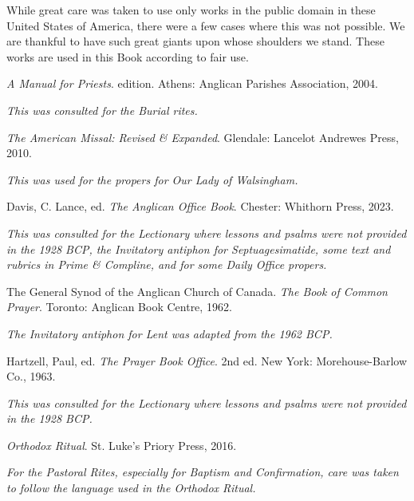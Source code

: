 \documentclass[10pt]{book}
\begin{document}
While great care was taken to use only works in the public domain in these United States of America, there were a few cases where this was not possible. We are thankful to have such great giants upon whose shoulders we stand. These works are used in this Book according to fair use.\par
\textit{A Manual for Priests}.  edition. Athens: Anglican Parishes Association, 2004.\par\noindent
\textit{This was consulted for the Burial rites.}\par
\textit{The American Missal: Revised \& Expanded}. Glendale: Lancelot Andrewes Press, 2010.\par\noindent
\textit{This was used for the propers for Our Lady of Walsingham.}\par
Davis, C. Lance, ed. \textit{The Anglican Office Book}. Chester: Whithorn Press, 2023.\par\noindent
\textit{This was consulted for the Lectionary where lessons and psalms were not provided in the 1928 BCP, the Invitatory antiphon for Septuagesimatide, some text and rubrics in Prime \& Compline, and for some Daily Office propers.}\par
The General Synod of the Anglican Church of Canada. \textit{The Book of Common Prayer}. Toronto: Anglican Book Centre, 1962.\par\noindent
\textit{The Invitatory antiphon for Lent was adapted from the 1962 BCP.}\par
Hartzell, Paul, ed. \textit{The Prayer Book Office}. 2nd ed. New York: Morehouse-Barlow Co., 1963.\par\noindent
\textit{This was consulted for the Lectionary where lessons and psalms were not provided in the 1928 BCP.}\par
\textit{Orthodox Ritual}. St. Luke's Priory Press, 2016.\par\noindent
\textit{For the Pastoral Rites, especially for Baptism and Confirmation, care was taken to follow the language used in the \emph{Orthodox Ritual}.}
\clearpage
\end{document}
